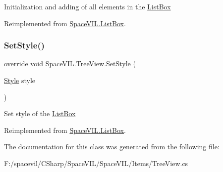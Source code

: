 Initialization and adding of all elements in the \mbox{\hyperlink{class_space_v_i_l_1_1_list_box}{List\+Box}} 



Reimplemented from \mbox{\hyperlink{class_space_v_i_l_1_1_list_box_a6fd8d4f254ff3954eb217cda21ebca45}{Space\+V\+I\+L.\+List\+Box}}.

\mbox{\label{class_space_v_i_l_1_1_tree_view_aac5935163cddb3e34bcef8ee112ae1dd}} 
\subsubsection{\texorpdfstring{Set\+Style()}{SetStyle()}}
{\footnotesize\ttfamily override void Space\+V\+I\+L.\+Tree\+View.\+Set\+Style (\begin{DoxyParamCaption}\item[{\mbox{\hyperlink{class_space_v_i_l_1_1_decorations_1_1_style}{Style}}}]{style }\end{DoxyParamCaption})\hspace{0.3cm}{\ttfamily [virtual]}}



Set style of the \mbox{\hyperlink{class_space_v_i_l_1_1_list_box}{List\+Box}} 



Reimplemented from \mbox{\hyperlink{class_space_v_i_l_1_1_list_box_aee5cd595b70e4ca4dff5022c662373d9}{Space\+V\+I\+L.\+List\+Box}}.



The documentation for this class was generated from the following file\+:\begin{DoxyCompactItemize}
\item 
F\+:/spacevil/\+C\+Sharp/\+Space\+V\+I\+L/\+Space\+V\+I\+L/\+Items/Tree\+View.\+cs\end{DoxyCompactItemize}
